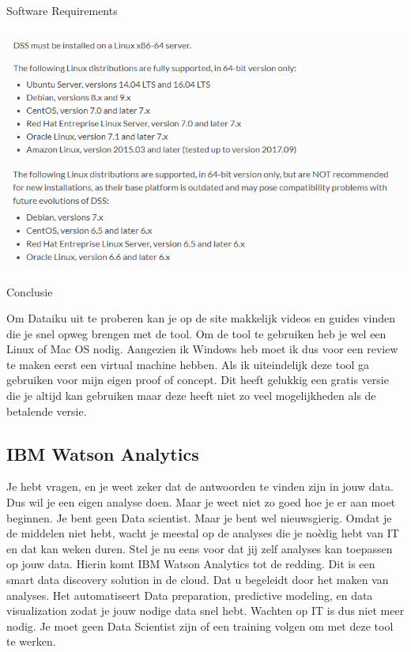Software Requirements

\includegraphics[scale=0.8]{img/software1}
\includegraphics[scale=0.8]{img/software2}

Conclusie

Om Dataiku uit te proberen kan je op de site makkelijk videos en guides vinden die je snel opweg brengen met de tool. Om de tool te gebruiken heb je wel een Linux of Mac OS nodig. Aangezien ik Windows heb moet ik dus voor een review te maken eerst een virtual machine hebben. Als ik uiteindelijk deze tool ga gebruiken voor mijn eigen proof of concept. Dit heeft gelukkig een gratis versie die je altijd kan gebruiken maar deze heeft niet zo veel mogelijkheden als de betalende versie.

\subsection{IBM Watson Analytics}
Je hebt vragen, en je weet zeker dat de antwoorden te vinden zijn in jouw data. Dus wil je een eigen analyse doen. Maar je weet niet zo goed hoe je er aan moet beginnen. Je bent geen Data scientist. Maar je bent wel nieuwsgierig. Omdat je de middelen niet hebt, wacht je meestal op de analyses die je noèdig hebt van IT en dat kan weken duren. Stel je nu eens voor dat jij zelf analyses kan toepassen op jouw data. Hierin komt IBM Watson Analytics tot de redding. Dit is een smart data discovery solution in de cloud. Dat u begeleidt door het maken van analyses. Het automatiseert Data preparation, predictive modeling, en data visualization zodat je jouw nodige data snel hebt. Wachten op IT is dus niet meer nodig. Je moet geen Data Scientist zijn of een training volgen om met deze tool te werken.  

